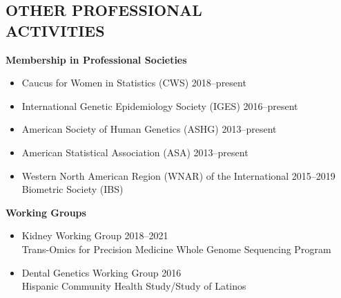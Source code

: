 \documentclass[margin]{res}
\begin{document}
\begin{resume}

\section{OTHER PROFESSIONAL \\ ACTIVITIES}  	

\hspace{0.1cm}\textbf{Membership in Professional Societies}
\begin{itemize}	 %
\item Caucus for Women in Statistics (CWS) \hfill 2018--present
\item International Genetic Epidemiology Society (IGES) \hfill 2016--present
\item American Society of Human Genetics (ASHG) \hfill 2013--present
\item American Statistical Association (ASA) \hfill 2013--present
\item Western North American Region (WNAR) of the International \hfill 2015--2019 \\  Biometric Society (IBS)  %
\end{itemize}
	
\hspace{0.1cm}\textbf{Working Groups}
\begin{itemize} %
\item Kidney Working Group \hfill 2018--2021 \\ Trans-Omics for Precision Medicine Whole Genome Sequencing Program 
\item Dental Genetics Working Group \hfill 2016 \\ Hispanic Community Health Study/Study of Latinos \\
\end{itemize}
						




\end{resume}
\end{document}
